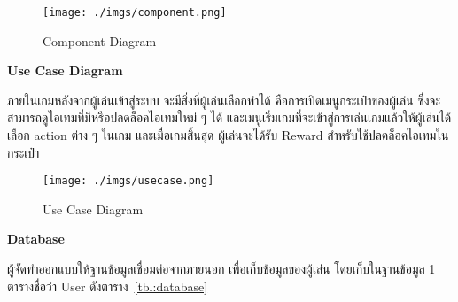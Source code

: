 \documentclass[12pt,oneside,openright,a4paper]{cpe-thai-project}
\begin{document}
\begin{figure}[H]\centering
  \texttt{[image: ./imgs/component.png]}
  \caption{Component Diagram}\label{fig:component}
\end{figure}

\pagebreak
\textbf{Use Case Diagram}

ภายในเกมหลังจากผู้เล่นเข้าสู่ระบบ จะมีสิ่งที่ผู้เล่นเลือกทำได้ 
คือการเปิดเมนูกระเป๋าของผู้เล่น ซึ่งจะสามารถดูไอเทมที่มีหรือปลดล็อคไอเทมใหม่ ๆ ได้ 
และเมนูเริ่มเกมที่จะเข้าสู่การเล่นเกมแล้วให้ผู้เล่นได้เลือก action ต่าง ๆ ในเกม 
และเมื่อเกมสิ้นสุด ผู้เล่นจะได้รับ Reward สำหรับใช้ปลดล็อคไอเทมในกระเป๋า

\begin{figure}[H]\centering
  \texttt{[image: ./imgs/usecase.png]}
  \caption{Use Case Diagram}\label{fig:usecase}
\end{figure}

\textbf{Database} 

ผู้จัดทำออกแบบให้ฐานข้อมูลเชื่อมต่อจากภายนอก เพื่อเก็บข้อมูลของผู้เล่น โดยเก็บในฐานข้อมูล 1 
ตารางชื่อว่า User ดังตาราง~\ref{tbl:database}
\end{document}
